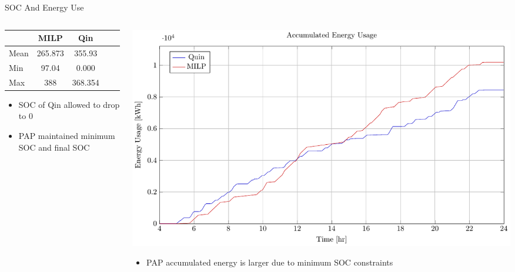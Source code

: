 \documentclass[aspectratio=169]{beamer}
\begin{document}
\begin{frame}[label={sec:org8d36888}]{SOC And Energy Use}
\begin{columns}
\begin{column}{0.5\columnwidth}
\begin{center}
\begin{tabular}{l|cccc}
\hline
 & MILP & Qin\\[0pt]
\hline
Mean & 265.873 & 355.93\\[0pt]
Min & 97.04 & 0.000\\[0pt]
Max & 388 & 368.354\\[0pt]
\hline
\end{tabular}
\end{center}

\begin{itemize}
\item SOC of Qin allowed to drop to 0
\item PAP maintained minimum SOC and final SOC
\end{itemize}
\end{column}

\begin{column}{0.5\columnwidth}
\begin{center}
\includegraphics[width=\textwidth]{./img/milp-pap/energy-milp-pap.pdf}
\end{center}

\begin{itemize}
\item PAP accumulated energy is larger due to minimum SOC constraints
\end{itemize}
\end{column}
\end{columns}
\end{frame}
\end{document}
